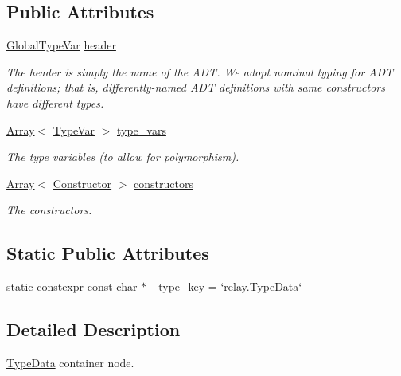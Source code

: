 \subsection*{Public Attributes}
\begin{DoxyCompactItemize}
\item 
\hyperlink{classtvm_1_1GlobalTypeVar}{Global\+Type\+Var} \hyperlink{classtvm_1_1TypeDataNode_a2fe297fe22375fbc180deb003d142ab9}{header}
\begin{DoxyCompactList}\small\item\em The header is simply the name of the A\+DT. We adopt nominal typing for A\+DT definitions; that is, differently-\/named A\+DT definitions with same constructors have different types. \end{DoxyCompactList}\item 
\hyperlink{classtvm_1_1Array}{Array}$<$ \hyperlink{classtvm_1_1TypeVar}{Type\+Var} $>$ \hyperlink{classtvm_1_1TypeDataNode_a350a23efc88be1def5b93d27ac6fa88b}{type\+\_\+vars}
\begin{DoxyCompactList}\small\item\em The type variables (to allow for polymorphism). \end{DoxyCompactList}\item 
\hyperlink{classtvm_1_1Array}{Array}$<$ \hyperlink{classtvm_1_1Constructor}{Constructor} $>$ \hyperlink{classtvm_1_1TypeDataNode_a4b8e6e09856e514b91586223d48fd117}{constructors}
\begin{DoxyCompactList}\small\item\em The constructors. \end{DoxyCompactList}\end{DoxyCompactItemize}
\subsection*{Static Public Attributes}
\begin{DoxyCompactItemize}
\item 
static constexpr const char $\ast$ \hyperlink{classtvm_1_1TypeDataNode_a75183ddef80f36ec7cf91507b858719b}{\+\_\+type\+\_\+key} = \char`\"{}relay.\+Type\+Data\char`\"{}
\end{DoxyCompactItemize}


\subsection{Detailed Description}
\hyperlink{classtvm_1_1TypeData}{Type\+Data} container node. 

